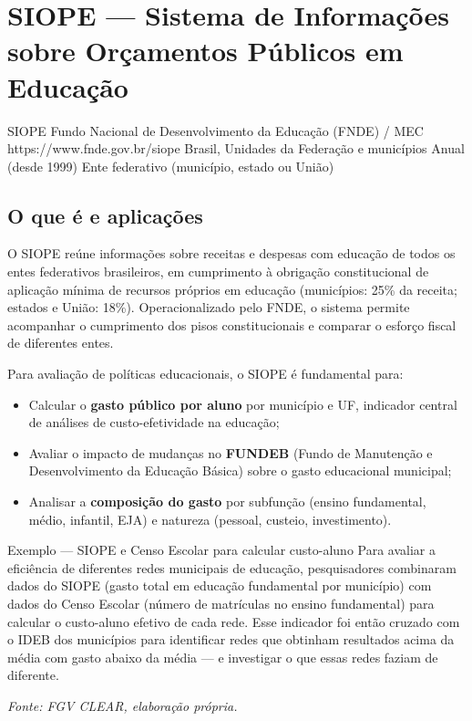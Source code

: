 \section{SIOPE — Sistema de Informações sobre Orçamentos Públicos em Educação}

\ficharapida
  {SIOPE}
  {Fundo Nacional de Desenvolvimento da Educação (FNDE) / MEC}
  {https://www.fnde.gov.br/siope}
  {Brasil, Unidades da Federação e municípios}
  {Anual (desde 1999)}
  {Ente federativo (município, estado ou União)}

\subsection{O que é e aplicações}

O SIOPE reúne informações sobre receitas e despesas com educação de todos os entes federativos brasileiros, em cumprimento à obrigação constitucional de aplicação mínima de recursos próprios em educação (municípios: 25\% da receita; estados e União: 18\%). Operacionalizado pelo FNDE, o sistema permite acompanhar o cumprimento dos pisos constitucionais e comparar o esforço fiscal de diferentes entes.

Para avaliação de políticas educacionais, o SIOPE é fundamental para:

\begin{itemize}
  \item Calcular o \textbf{gasto público por aluno} por município e UF, indicador central de análises de custo-efetividade na educação;
  \item Avaliar o impacto de mudanças no \textbf{FUNDEB} (Fundo de Manutenção e Desenvolvimento da Educação Básica) sobre o gasto educacional municipal;
  \item Analisar a \textbf{composição do gasto} por subfunção (ensino fundamental, médio, infantil, EJA) e natureza (pessoal, custeio, investimento).
\end{itemize}

\begin{boxexemplo}{Exemplo — SIOPE e Censo Escolar para calcular custo-aluno}
Para avaliar a eficiência de diferentes redes municipais de educação, pesquisadores combinaram dados do SIOPE (gasto total em educação fundamental por município) com dados do Censo Escolar (número de matrículas no ensino fundamental) para calcular o custo-aluno efetivo de cada rede. Esse indicador foi então cruzado com o IDEB dos municípios para identificar redes que obtinham resultados acima da média com gasto abaixo da média — e investigar o que essas redes faziam de diferente.

\textit{Fonte: FGV CLEAR, elaboração própria.}
\end{boxexemplo}

